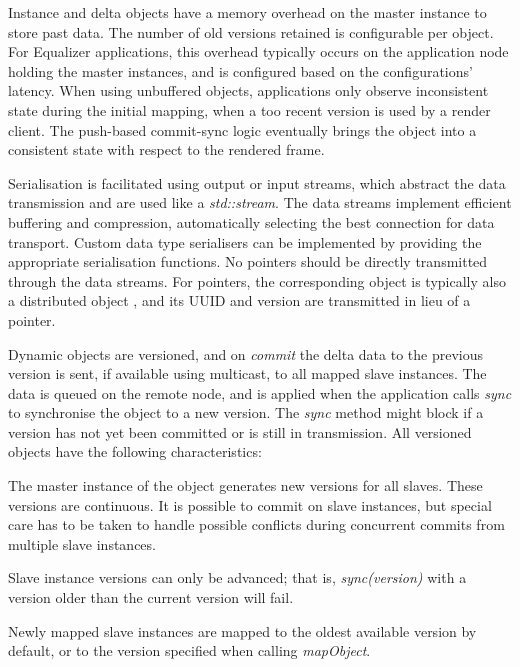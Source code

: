 Instance and delta objects have a memory overhead on the master instance to
store past data. The number of old versions retained is configurable per
object. For Equalizer applications, this overhead typically occurs on the
application node holding the master instances, and is configured based on the
configurations' latency. When using unbuffered objects, applications only
observe inconsistent state during the initial mapping, when a too recent
version is used by a render client. The push-based commit-sync logic eventually
brings the object into a consistent state with respect to the rendered frame.

Serialisation is facilitated using output or input streams, which abstract the
data transmission and are used like a {\em std::stream}. The data streams
implement efficient buffering and compression, automatically selecting the best
connection for data transport. Custom data type serialisers can be implemented
by providing the appropriate serialisation functions. No pointers should be
directly transmitted through the data streams. For pointers, the corresponding
object is typically also a distributed object , and its UUID and version are
transmitted in lieu of a pointer.

Dynamic objects are versioned, and on {\em commit} the delta data to the
previous version is sent, if available using multicast, to all mapped slave
instances. The data is queued on the remote node, and is applied when the
application calls {\em sync} to synchronise the object to a new version. The
{\em sync} method might block if a version has not yet been committed or is
still in transmission. All versioned objects have the following characteristics:

\begin{compactitem}

\item The master instance of the object generates new versions for all slaves.
These versions are continuous. It is possible to commit on slave instances, but
special care has to be taken to handle possible conflicts during concurrent
commits from multiple slave instances.

\item Slave instance versions can only be advanced; that is,
{\em sync(version)} with a version older than the current version will fail.

\item Newly mapped slave instances are mapped to the oldest available version
by default, or to the version specified when calling {\em mapObject}.

\end{compactitem}

